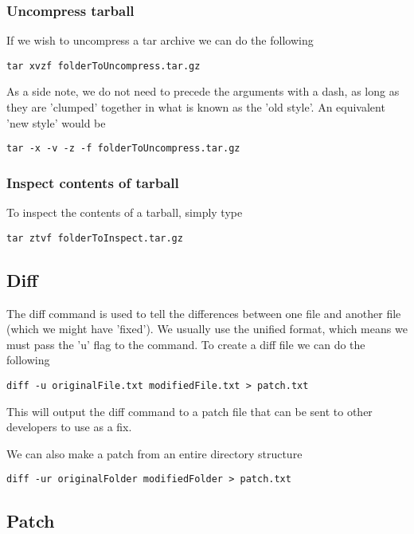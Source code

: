 \documentclass[a4paper, 10pt]{article}
\begin{document}
\subsubsection*{Uncompress tarball}
\label{sec:uncompress-tarball}

If we wish to uncompress a tar archive we can do the following
\begin{verbatim}
tar xvzf folderToUncompress.tar.gz
\end{verbatim}
As a side note, we do not need to precede the arguments with a dash,
as long as they are 'clumped' together in what is known as the 'old
style'. An equivalent 'new style' would be
\begin{verbatim}
tar -x -v -z -f folderToUncompress.tar.gz
\end{verbatim}

\subsubsection*{Inspect contents of tarball}
\label{sec:insp-cont-tarb}

To inspect the contents of a tarball, simply type
\begin{verbatim}
tar ztvf folderToInspect.tar.gz
\end{verbatim}

\subsection*{Diff}
\label{sec:diff}

The diff command is used to tell the differences between one file and
another file (which we might have 'fixed'). We usually use the unified
format, which means we must pass the 'u' flag to the command. To
create a diff file we can do the following
\begin{verbatim}
diff -u originalFile.txt modifiedFile.txt > patch.txt
\end{verbatim}
This will output the diff command to a patch file that can be sent to
other developers to use as a fix.

We can also make a patch from an entire directory structure
\begin{verbatim}
diff -ur originalFolder modifiedFolder > patch.txt
\end{verbatim}

\subsection*{Patch}
\label{sec:patch}
\end{document}
